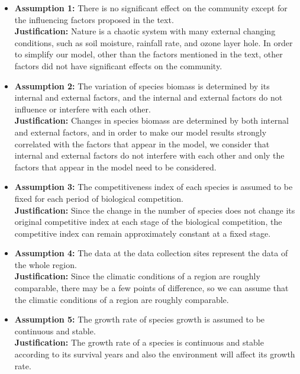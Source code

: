 \documentclass[12pt]{article}
\begin{document}
\begin{itemize}
	\item \textbf{Assumption 1:} There is no significant effect on the community except for the influencing factors proposed in the text. \\
	      \textbf{Justification:} Nature is a chaotic system with many external changing conditions, such as soil moisture, rainfall rate, and ozone layer hole. In order to simplify our model, other than the factors mentioned in the text, other factors did not have significant effects on the community.

	\item \textbf{Assumption 2:} The variation of species biomass is determined by its internal and external factors, and the internal and external factors do not influence or interfere with each other. \\
	      \textbf{Justification:} Changes in species biomass are determined by both internal and external factors, and in order to make our model results strongly correlated with the factors that appear in the model, we consider that internal and external factors do not interfere with each other and only the factors that appear in the model need to be considered.

	\item \textbf{Assumption 3:} The competitiveness index of each species is assumed to be fixed for each period of biological competition.\\
	      \textbf{Justification:} Since the change in the number of species does not change its original competitive index at each stage of the biological competition, the competitive index can remain approximately constant at a fixed stage.

	\item \textbf{Assumption 4:} The data at the data collection sites represent the data of the whole region.\\
	      \textbf{Justification:} Since the climatic conditions of a region are roughly comparable, there may be a few points of difference, so we can assume that the climatic conditions of a region are roughly comparable.

	\item \textbf{Assumption 5:} The growth rate of species growth is assumed to be continuous and stable.\\
	      \textbf{Justification:} The growth rate of a species is continuous and stable according to its survival years and also the environment will affect its growth rate.
\end{itemize}
\end{document}
